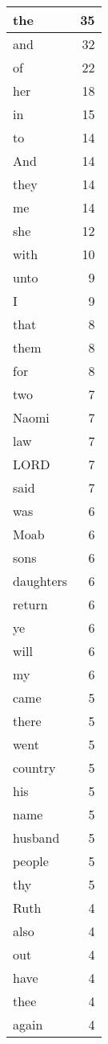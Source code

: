 \begin{center}
\begin{longtable}{l|r}
\hline \hline
\endlastfoot
the & 35 \\ \hline
and & 32 \\ \hline
of & 22 \\ \hline
her & 18 \\ \hline
in & 15 \\ \hline
to & 14 \\ \hline
And & 14 \\ \hline
they & 14 \\ \hline
me & 14 \\ \hline
she & 12 \\ \hline
with & 10 \\ \hline
unto & 9 \\ \hline
I & 9 \\ \hline
that & 8 \\ \hline
them & 8 \\ \hline
for & 8 \\ \hline
two & 7 \\ \hline
Naomi & 7 \\ \hline
law & 7 \\ \hline
LORD & 7 \\ \hline
said & 7 \\ \hline
was & 6 \\ \hline
Moab & 6 \\ \hline
sons & 6 \\ \hline
daughters & 6 \\ \hline
return & 6 \\ \hline
ye & 6 \\ \hline
will & 6 \\ \hline
my & 6 \\ \hline
came & 5 \\ \hline
there & 5 \\ \hline
went & 5 \\ \hline
country & 5 \\ \hline
his & 5 \\ \hline
name & 5 \\ \hline
husband & 5 \\ \hline
people & 5 \\ \hline
thy & 5 \\ \hline
Ruth & 4 \\ \hline
also & 4 \\ \hline
out & 4 \\ \hline
have & 4 \\ \hline
thee & 4 \\ \hline
again & 4 \\ \hline

\end{longtable}
\end{center}
